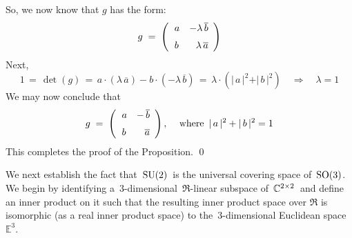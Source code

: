 So, we now know that $g$ has the form:
\begin{equation*}
g
\; = \;
	\left(\begin{array}{rr}
		a & -\lambda\,\overline{b}
		\\
		\overset{{\color{white}-}}{b} & \lambda\,\overline{a}
		\end{array}\right)
\end{equation*}
Next,
\begin{equation*}
1
\,=\, \det(g)
\,=\, a\cdot(\lambda\,\overline{a}) - b \cdot (-\lambda\,\overline{b})
\,=\, \lambda\cdot(\vert\,a\,\vert^{2} + \vert\,b\,\vert^{2})
\quad\Longrightarrow\quad
	\lambda = 1
\end{equation*}
We may now conclude that
\begin{equation*}
g
\; = \;
	\left(\begin{array}{rr}
		a & -\,\overline{b}
		\\
		\overset{{\color{white}-}}{b} & \overline{a}
		\end{array}\right),\,
\quad
\textnormal{where \,$\vert\,a\,\vert^{2} + \vert\,b\,\vert^{2} = 1$}
\end{equation*}
This completes the proof of the Proposition.
\qed


\vskip 0.5cm
\noindent
We next establish the fact that \,$\textnormal{SU}(2)$\, is the universal covering space of \,$\textnormal{SO}(3)$.\,
We begin by identifying a \,$3$-dimensional \,$\Re$-linear subspace of \,$\mathbb{C}^{2 \times 2}$\,
and define an inner product on it such that the resulting inner product space over $\Re$
is isomorphic (as a real inner product space) to the \,$3$-dimensional Euclidean space \,$\mathbb{E}^{3}$.

